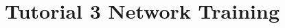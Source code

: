 \documentclass[10pt,twocolumn,letterpaper]{article}
\begin{document}






\section{Tutorial 3 Network Training}
\end{document}
